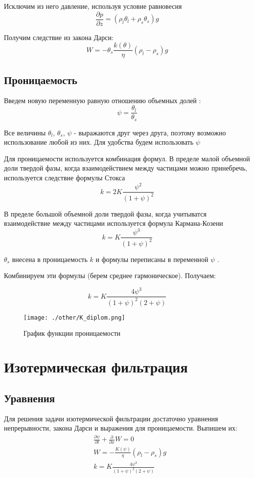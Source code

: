 \documentclass[12pt,a4paper]{article}
\newcommand{\pd}[2]{\frac{\partial #1}{\partial #2}}
\begin{document}
Исключим из него давление, используя условие равновесия
$$
\pd{p}{z} = (\rho_l \theta_l + \rho_s \theta_s)g
$$

Получим следствие из закона Дарси:
\begin{equation}
W= -\theta_s \frac{k(\theta)}{\eta}(\rho_l-\rho_s)g
\label{Darsi_new}
\end{equation}

\subsection{Проницаемость}
Введем новую переменную равную отношению объемных долей : 
$$
\psi = \frac{\theta_l}{\theta_s} 
$$

Все величины $\theta_l $, $\theta_s $, $\psi $ - выражаются друг через друга, поэтому возможно использование любой из них. Для удобства будем использовать $\psi$

Для проницаемости используется комбинация формул. В пределе малой объемной доли твердой фазы, когда взаимодействием между частицами можно принебречь, используется следствие формулы Стокса 
$$
k = 2 K\frac{\psi^2}{(1+\psi)^2} 
$$

В пределе большой объемной доли твердой фазы, когда учитыватся взаимодействие между частицами используется формула Кармана-Козени 
$$
k = K\frac{\psi^3}{(1+\psi)^2}
$$

$\theta_s $ внесена в проницаемость $k$ и формулы переписаны в переменной $\psi$ . 

Комбинируем эти формулы (берем среднее гармоническое). Получаем:

\begin{equation}
k = K \frac{4\psi^3}{(1+\psi)^2(2+\psi)}
\label{permability}
\end{equation}

\begin{figure}[h!]
\begin{center}
\texttt{[image: ./other/K\_diplom.png]}
\caption{График функции проницаемости}
\end{center}
\end{figure}
\newpage
\section{Изотермическая фильтрация}
\subsection{Уравнения}
Для решения задачи изотермической фильтрации достаточно уравнения непрерывности, закона Дарси и выражения для проницаемости. Выпишем их:
\begin{equation}
\begin{aligned}
&\pd{\psi}{t} + \pd{}{x}W = 0\\
&W= -\frac{K(\psi)}{\eta}(\rho_l-\rho_s)g\\
&k = K \frac{4\psi^3}{(1+\psi)^2(2+\psi)}\\
\label{isotermal}
\end{aligned}
\end{equation}
\end{document}
